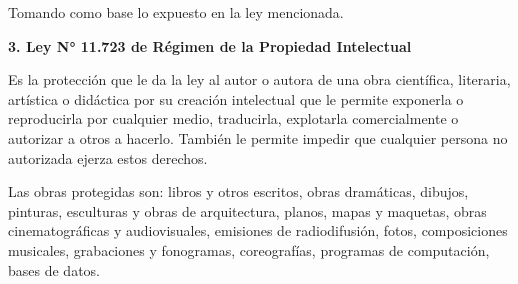 \documentclass[a4paper,12pt]{article}
\begin{document}
    \par Tomando como base lo expuesto en la ley mencionada. \cite{Ley26388}
    \newline
    \par \textbf{3. Ley N° 11.723 de Régimen de la Propiedad Intelectual} 
    \newline
    \par Es la protección que le da la ley al autor o autora de una obra científica, literaria, artística o didáctica por su creación intelectual que le permite exponerla o reproducirla por cualquier medio, traducirla, explotarla comercialmente o autorizar a otros a hacerlo. También le permite impedir que cualquier persona no autorizada ejerza estos derechos.
    \par Las obras protegidas son: libros y otros escritos, obras dramáticas, dibujos, pinturas, esculturas y obras de arquitectura, planos, mapas y maquetas, obras cinematográficas y audiovisuales, emisiones de radiodifusión, fotos, composiciones musicales, grabaciones y fonogramas, coreografías, programas de computación, bases de datos.\cite{Ley11723}
\end{document}
